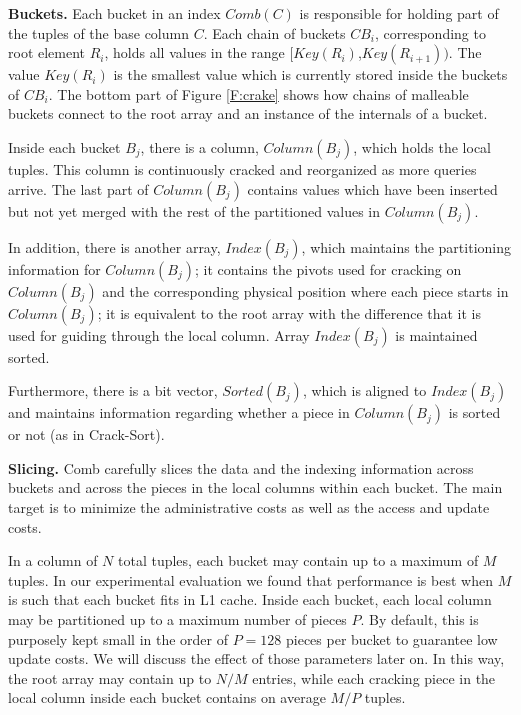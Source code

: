 \documentclass{sig-alternate}
\begin{document}
\textbf{Buckets.}
Each bucket in an index $Comb(C)$ is responsible for holding part of the tuples of the base column $C$.
Each chain of buckets $CB_i$, corresponding to root element $R_i$, holds all values in the range $[Key(R_i)$,$Key(R_{i+1}))$.
The value $Key(R_i)$ is the smallest value which is currently stored inside the buckets of $CB_i$.
The bottom part of Figure \ref{F:crake} shows how chains of malleable buckets
connect to the root array and an instance of the internals of a bucket.

Inside each bucket $B_j$, there is a column, $Column(B_j)$, which holds the local tuples.
This column is continuously cracked and reorganized as more queries arrive.
The last part of $Column(B_j)$ contains values which have been inserted but not yet merged with
the rest of the partitioned values in $Column(B_j)$.

In addition, there is another array, $Index(B_j)$, which maintains the partitioning information for $Column(B_j)$;
it contains the pivots used for cracking on $Column(B_j)$ and the corresponding physical position
where each piece starts in $Column(B_j)$; it is equivalent to the root array with the difference that it is used
for guiding through the local column.
Array $Index(B_j)$ is maintained sorted.

Furthermore, there is a bit vector, $Sorted(B_j)$, which is aligned to $Index(B_j)$ and
maintains information regarding whether a piece in $Column(B_j)$ is sorted or not (as in Crack-Sort).

\textbf{Slicing.}
Comb carefully slices the data and the indexing information across buckets
and across the pieces in the local columns within each bucket.
The main target is to minimize the administrative costs as well as the access and update costs.

In a column of $N$ total tuples, each bucket may contain up to a maximum of $M$ tuples.
In our experimental evaluation we found that performance is best when $M$ is such that each bucket fits in L1 cache.
Inside each bucket, each local column may be partitioned up to a maximum number of pieces $P$.
By default, this is purposely kept small in the order of $P=128$ pieces per bucket to guarantee low update costs.
We will discuss the effect of those parameters later on.
In this way, the root array may contain up to $N/M$ entries,
while each cracking piece in the local column inside each bucket contains on average  $M/P$ tuples.
\end{document}
